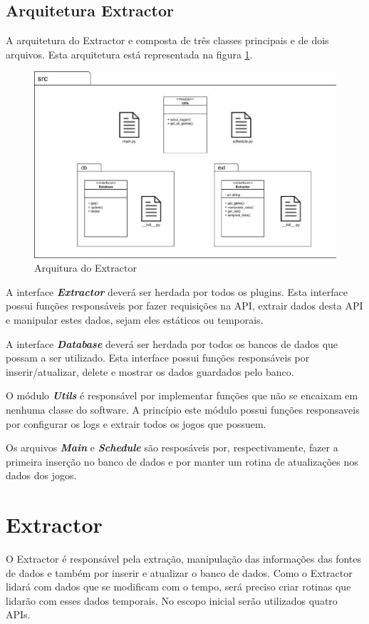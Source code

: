 \subsection{Arquitetura Extractor}
A arquitetura do Extractor e composta de três classes principais e de dois arquivos. Esta arquitetura está representada na figura \ref{image:extractor}.
\begin{figure} [H]
\centering
\includegraphics[scale=0.5]{figuras/arquiteturaExtractor.eps}
\caption{Arquitura do Extractor}
\label{image:extractor}
\end{figure}
A interface \textit{\textbf{Extractor}} deverá ser herdada por todos os plugins. Esta interface possui funções responsáveis por fazer requisições na API, extrair dados desta API e manipular estes dados, sejam eles estáticos ou temporais.

A interface \textit{\textbf{Database}} deverá ser herdada por todos os bancos de dados que possam a ser utilizado. Esta interface possui funções responsáveis por inserir/atualizar, delete e mostrar os dados guardados pelo banco.

O módulo \textit{\textbf{Utils}} é responsável por implementar funções que não se encaixam em nenhuma classe do software. A princípio este módulo possui funções responsaveis por configurar os logs e extrair todos os jogos que possuem.

Os arquivos \textit{\textbf{Main}} e \textit{\textbf{Schedule}} são resposáveis por, respectivamente, fazer a primeira inserção no banco de dados e por manter um rotina de atualizações nos dados dos jogos.

\section{Extractor}
O Extractor é responsável pela extração, manipulação das informações das fontes de dados e também por inserir e atualizar o banco de dados. Como o Extractor lidará com dados que se modificam com o tempo, será preciso criar rotinas que lidarão com esses dados temporais. No escopo inicial serão utilizados quatro APIs.

